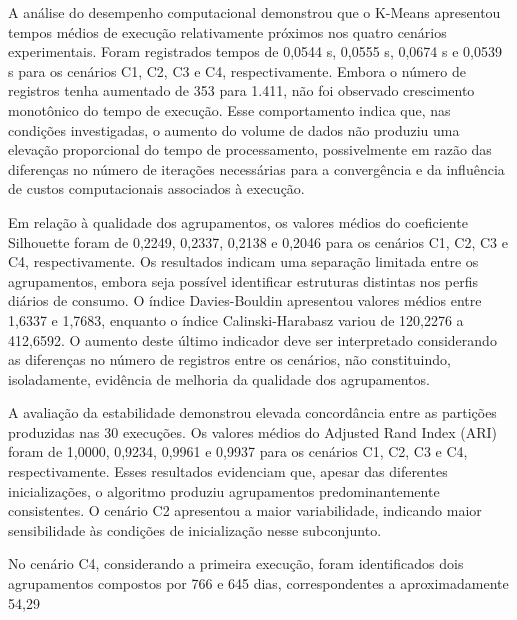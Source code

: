 \documentclass[lettersize,journal]{IEEEtran}
\begin{document}
A análise do desempenho computacional demonstrou que o K-Means apresentou tempos médios de execução relativamente próximos nos quatro cenários experimentais. Foram registrados tempos de 0,0544 s, 0,0555 s, 0,0674 s e 0,0539 s para os cenários C1, C2, C3 e C4, respectivamente. Embora o número de registros tenha aumentado de 353 para 1.411, não foi observado crescimento monotônico do tempo de execução. Esse comportamento indica que, nas condições investigadas, o aumento do volume de dados não produziu uma elevação proporcional do tempo de processamento, possivelmente em razão das diferenças no número de iterações necessárias para a convergência e da influência de custos computacionais associados à execução.

Em relação à qualidade dos agrupamentos, os valores médios do coeficiente Silhouette foram de 0,2249, 0,2337, 0,2138 e 0,2046 para os cenários C1, C2, C3 e C4, respectivamente. Os resultados indicam uma separação limitada entre os agrupamentos, embora seja possível identificar estruturas distintas nos perfis diários de consumo. O índice Davies-Bouldin apresentou valores médios entre 1,6337 e 1,7683, enquanto o índice Calinski-Harabasz variou de 120,2276 a 412,6592. O aumento deste último indicador deve ser interpretado considerando as diferenças no número de registros entre os cenários, não constituindo, isoladamente, evidência de melhoria da qualidade dos agrupamentos.

A avaliação da estabilidade demonstrou elevada concordância entre as partições produzidas nas 30 execuções. Os valores médios do Adjusted Rand Index (ARI) foram de 1,0000, 0,9234, 0,9961 e 0,9937 para os cenários C1, C2, C3 e C4, respectivamente. Esses resultados evidenciam que, apesar das diferentes inicializações, o algoritmo produziu agrupamentos predominantemente consistentes. O cenário C2 apresentou a maior variabilidade, indicando maior sensibilidade às condições de inicialização nesse subconjunto.

No cenário C4, considerando a primeira execução, foram identificados dois agrupamentos compostos por 766 e 645 dias, correspondentes a aproximadamente 54,29%
\end{document}
